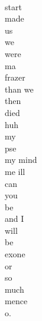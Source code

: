 \documentclass[smalldemyvopaper,11pt,twoside,onecolumn,openright,extrafontsizes]{memoir}
\begin{document}
\\start
\\made
\\us
\\we
\\were
\\ma
\\frazer
\\than we
\\then
\\died
\\huh
\\my
\\pse
\\my mind
\\me ill
\\can
\\you
\\be
\\and I
\\will
\\be
\\exone
\\or
\\so
\\much
\\mence
\\o.
\end{document}
